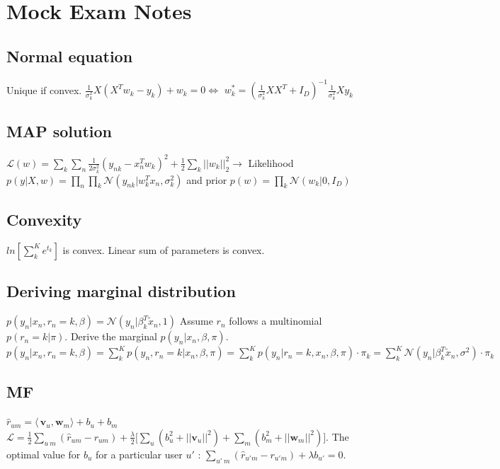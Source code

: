 \section{Mock Exam Notes}
\subsection{Normal equation}
Unique if convex.\newline
$\frac{1}{\sigma_k^2} X(X^Tw_k-y_k)+w_k = 0 \Leftrightarrow$ \newline
$ w_k^* = (\frac{1}{\sigma_k^2} XX^T+I_D)^{-1} \frac{1}{\sigma_k^2}Xy_k$

\subsection{MAP solution}
$\mathcal{L}(w) = \sum_k \sum_n \frac{1}{2\sigma_k^2} (y_{nk} - x_n^T w_k)^2 + \frac{1}{2} \sum_k ||w_k||^2_2 \rightarrow$
Likelihood $p(y|X,w) = \prod_n \prod_k \mathcal{N}(y_{nk}|w_k^Tx_n, \sigma_k^2)$ and prior $p(w) = \prod_k \mathcal{N}(w_k|0,I_D)$

\subsection{Convexity}
$ln[\sum_k^Ke^{t_k}]$ is convex. Linear sum of parameters is convex.

\subsection{Deriving marginal distribution}
$p(y_n|x_n,r_n=k,\beta) = \mathcal{N} (y_n|\beta_k^T\tilde{x}_n,1)$
Assume $r_n$ follows a multinomial $p(r_n=k|\pi)$. Derive the marginal $p(y_n|x_n,\beta,\pi)$.
$p(y_n|x_n,r_n=k,\beta) = \sum_k^K p(y_n,r_n=k|x_n,\beta,\pi) = \sum_k^K p(y_n|r_n=k,x_n,\beta,\pi) \cdot \pi_k = \sum_k^K \mathcal{N}(y_n|\beta_k^T\tilde{x}_n, \sigma^2)\cdot \pi_k$

\subsection{MF}
$\hat{r}_{um} = \langle\,\mathbf{v}_u,\mathbf{w}_m\rangle + b_u + b_m$
$\mathcal{L} = \frac{1}{2} \sum_{u ~ m}(\hat{r}_{um} -r_{um}) + \frac{\lambda}{2} \big[
\sum_u (b_u^2+||\mathbf{v}_u||^2) + \sum_m (b_m^2+||\mathbf{w}_m||^2) \big]$. The optimal value for $b_u$ for a particular user $u'$ : $\sum_{u' ~ m} (\hat{r}_{u'm} - r_{u'm}) + \lambda b_{u'} = 0$.

